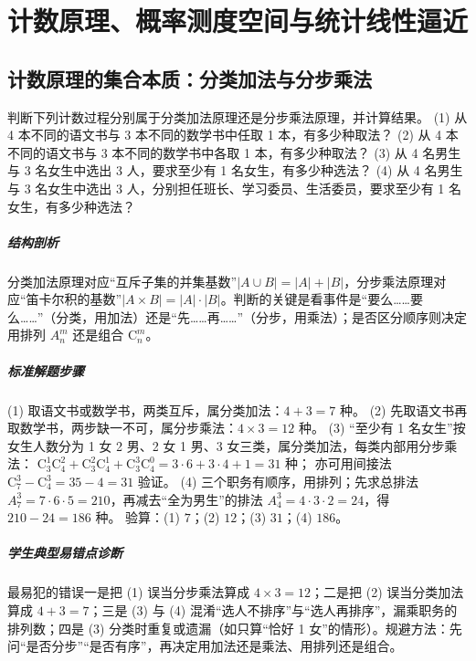 \chapter{计数原理、概率测度空间与统计线性逼近}

\section{计数原理的集合本质：分类加法与分步乘法}

\begin{problem}
判断下列计数过程分别属于分类加法原理还是分步乘法原理，并计算结果。
(1) 从 4 本不同的语文书与 3 本不同的数学书中任取 1 本，有多少种取法？
(2) 从 4 本不同的语文书与 3 本不同的数学书中各取 1 本，有多少种取法？
(3) 从 4 名男生与 3 名女生中选出 3 人，要求至少有 1 名女生，有多少种选法？
(4) 从 4 名男生与 3 名女生中选出 3 人，分别担任班长、学习委员、生活委员，要求至少有 1 名女生，有多少种选法？
\end{problem}
\begin{solution}
\paragraph{结构剖析}
分类加法原理对应“互斥子集的并集基数”$|A\cup B|=|A|+|B|$，分步乘法原理对应“笛卡尔积的基数”$|A\times B|=|A|\cdot|B|$。判断的关键是看事件是“要么……要么……”（分类，用加法）还是“先……再……”（分步，用乘法）；是否区分顺序则决定用排列 $A_n^m$ 还是组合 $\mathrm{C}_n^m$。
\paragraph{标准解题步骤}
(1) 取语文书或数学书，两类互斥，属分类加法：$4+3=7$ 种。
(2) 先取语文书再取数学书，两步缺一不可，属分步乘法：$4\times3=12$ 种。
(3) “至少有 1 名女生”按女生人数分为 1 女 2 男、2 女 1 男、3 女三类，属分类加法，每类内部用分步乘法：
$\mathrm{C}_3^1\mathrm{C}_4^2+\mathrm{C}_3^2\mathrm{C}_4^1+\mathrm{C}_3^3\mathrm{C}_4^0=3\cdot6+3\cdot4+1=31$ 种；
亦可用间接法 $\mathrm{C}_7^3-\mathrm{C}_4^3=35-4=31$ 验证。
(4) 三个职务有顺序，用排列；先求总排法 $A_7^3=7\cdot6\cdot5=210$，再减去“全为男生”的排法 $A_4^3=4\cdot3\cdot2=24$，得 $210-24=186$ 种。
验算：(1) $7$；(2) $12$；(3) $31$；(4) $186$。
\paragraph{学生典型易错点诊断}
最易犯的错误一是把 (1) 误当分步乘法算成 $4\times3=12$；二是把 (2) 误当分类加法算成 $4+3=7$；三是 (3) 与 (4) 混淆“选人不排序”与“选人再排序”，漏乘职务的排列数；四是 (3) 分类时重复或遗漏（如只算“恰好 1 女”的情形）。规避方法：先问“是否分步”“是否有序”，再决定用加法还是乘法、用排列还是组合。
\end{solution}

